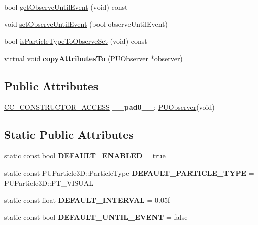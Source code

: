 \begin{DoxyCompactItemize}
\item 
bool \hyperlink{classPUObserver_a7d44e67979d599d99333e20c2faa73f0}{get\+Observe\+Until\+Event} (void) const
\item 
void \hyperlink{classPUObserver_a798f63e99e51477fd10b70167d0ddf4a}{set\+Observe\+Until\+Event} (bool observe\+Until\+Event)
\item 
bool \hyperlink{classPUObserver_a50f62938d95ab7c7f2028d889bdc56ca}{is\+Particle\+Type\+To\+Observe\+Set} (void) const
\item 
\mbox{\label{classPUObserver_a681a45f01f8da608f4686b633aac9e9b}} 
virtual void {\bfseries copy\+Attributes\+To} (\hyperlink{classPUObserver}{P\+U\+Observer} $\ast$observer)
\end{DoxyCompactItemize}
\subsection*{Public Attributes}
\begin{DoxyCompactItemize}
\item 
\mbox{\label{classPUObserver_a5029a1daf7d598d11a5d18c23a600b71}} 
\hyperlink{_2cocos2d_2cocos_2base_2ccConfig_8h_a25ef1314f97c35a2ed3d029b0ead6da0}{C\+C\+\_\+\+C\+O\+N\+S\+T\+R\+U\+C\+T\+O\+R\+\_\+\+A\+C\+C\+E\+SS} {\bfseries \+\_\+\+\_\+pad0\+\_\+\+\_\+}\+: \hyperlink{classPUObserver}{P\+U\+Observer}(void)
\end{DoxyCompactItemize}
\subsection*{Static Public Attributes}
\begin{DoxyCompactItemize}
\item 
\mbox{\label{classPUObserver_a402d18a070beab3b326879f47723996a}} 
static const bool {\bfseries D\+E\+F\+A\+U\+L\+T\+\_\+\+E\+N\+A\+B\+L\+ED} = true
\item 
\mbox{\label{classPUObserver_a56f3af315931ed9623c1a9dc1467ee41}} 
static const P\+U\+Particle3\+D\+::\+Particle\+Type {\bfseries D\+E\+F\+A\+U\+L\+T\+\_\+\+P\+A\+R\+T\+I\+C\+L\+E\+\_\+\+T\+Y\+PE} = P\+U\+Particle3\+D\+::\+P\+T\+\_\+\+V\+I\+S\+U\+AL
\item 
\mbox{\label{classPUObserver_a6a92bfb99992284846331d852e2bf5ba}} 
static const float {\bfseries D\+E\+F\+A\+U\+L\+T\+\_\+\+I\+N\+T\+E\+R\+V\+AL} = 0.\+05f
\item 
\mbox{\label{classPUObserver_ae40b43f434b1ff5c5fa0d46c130f5edd}} 
static const bool {\bfseries D\+E\+F\+A\+U\+L\+T\+\_\+\+U\+N\+T\+I\+L\+\_\+\+E\+V\+E\+NT} = false
\end{DoxyCompactItemize}
